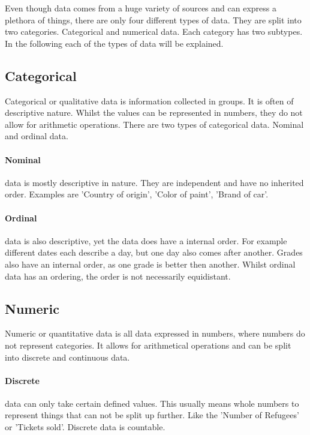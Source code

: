Even though data comes from a huge variety of sources and can express a plethora of things, there are only four different types of data\cite{henze_2021}. They are split into two categories. Categorical and numerical data. Each category has two subtypes. In the following each of the types of data will be explained.

\subsection{Categorical}

Categorical or qualitative data is information collected in groups. It is often of descriptive nature. Whilst the values can be represented in numbers, they do not allow for arithmetic operations.
There are two types of categorical data. Nominal and ordinal data.

\paragraph{Nominal}
data is mostly descriptive in nature. They are independent and have no inherited order. Examples are 'Country of origin', 'Color of paint', 'Brand of car'.

\paragraph{Ordinal}
data is also descriptive, yet the data does have a internal order. For example different dates each describe a day, but one day also comes after another. Grades also have an internal order, as one grade is better then another. Whilst ordinal data has an ordering, the order is not necessarily equidistant.

\subsection{Numeric}

Numeric or quantitative data is all data expressed in numbers, where numbers do not represent categories. It allows for arithmetical operations and can be split into discrete and continuous data.

\paragraph{Discrete}
data can only take certain defined values. This usually means whole numbers to represent things that can not be split up further. Like the 'Number of Refugees' or 'Tickets sold'. Discrete data is countable.

